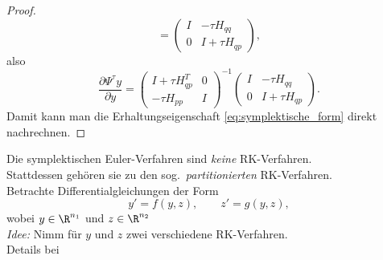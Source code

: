 \begin{proof}
\begin{equation*}
	=
	\begin{pmatrix}
		I & -\tau H_{qq} \\ 0 & I+\tau H_{qp}
	\end{pmatrix},
\end{equation*}
also
\begin{equation*}
	\frac{\partial \Psi^\tau y}{\partial y} = \begin{pmatrix}
	I + \tau H_{qp}^T & 0 \\ -\tau H_{pp} & I
	\end{pmatrix}^{-1} \begin{pmatrix}
	I & -\tau H_{qq} \\ 0 & I+\tau H_{qp}
	\end{pmatrix}.
\end{equation*}
Damit kann man die Erhaltungseigenschaft \eqref{eq:symplektische_form} direkt nachrechnen.
\end{proof}

\medskip

Die symplektischen Euler-Verfahren sind \emph{keine} RK-Verfahren.\\
Stattdessen gehören sie zu den sog.\ \emph{partitionierten} RK-Verfahren.\\
Betrachte Differentialgleichungen der Form
\begin{equation*}
	y'=f(y,z),\qquad z'=g(y,z),
\end{equation*}
wobei $y\in\R^{n_1}$ und $z\in\R^{n_2}$\\
\emph{Idee:} Nimm für $y$ und $z$ zwei verschiedene RK-Verfahren.\\
Details bei \citet[Kapitel II.2]{hairer_lubich_wanner:2006}

\medskip

